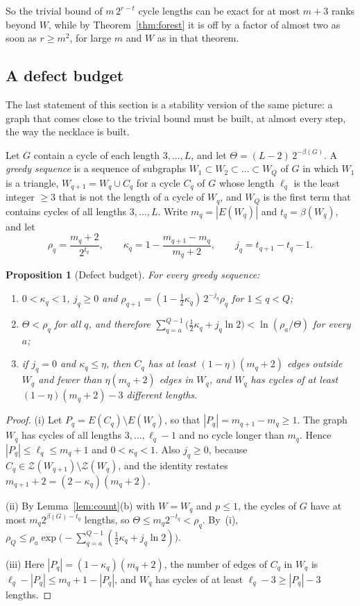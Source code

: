 \documentclass[11pt]{article}
\newtheorem{proposition}[theorem]{Proposition}
\theoremstyle{definition}
\theoremstyle{remark}
\newcommand{\Z}{\mathcal{Z}}
\newcommand{\sm}{\setminus}
\newcommand{\half}{\tfrac12}
\begin{document}
So the trivial bound of $m\,2^{r-t}$ cycle lengths can be exact for at most $m+3$ ranks beyond
$W$, while by Theorem~\ref{thm:forest} it is off by a factor of almost two as soon as $r\ge m^{2}$,
for large $m$ and $W$ as in that theorem.

\subsection{A defect budget}

The last statement of this section is a stability version of the same picture: a graph that comes
close to the trivial bound must be built, at almost every step, the way the necklace is built.

Let $G$ contain a cycle of each length $3,\dots,L$, and let $\Theta=(L-2)\,2^{-\beta(G)}$. A
\emph{greedy sequence} is a sequence of subgraphs $W_1\subset W_2\subset\dots\subset W_Q$ of $G$ in
which $W_1$ is a triangle, $W_{q+1}=W_q\cup C_q$ for a cycle $C_q$ of $G$ whose length $\ell_q$ is
the least integer $\ge3$ that is not the length of a cycle of $W_q$, and $W_Q$ is the first term
that contains cycles of all lengths $3,\dots,L$. Write $m_q=|E(W_q)|$ and $t_q=\beta(W_q)$, and let
\[
  \rho_q=\frac{m_q+2}{2^{t_q}},\qquad
  \kappa_q=1-\frac{m_{q+1}-m_q}{m_q+2},\qquad
  j_q=t_{q+1}-t_q-1 .
\]

\begin{proposition}[Defect budget]\label{prop:defect}
For every greedy sequence:
\begin{enumerate}
\item[\textup{(i)}] $0<\kappa_q<1$, $j_q\ge0$ and $\rho_{q+1}=(1-\half\kappa_q)\,2^{-j_q}\rho_q$ for
$1\le q<Q$;
\item[\textup{(ii)}] $\Theta<\rho_q$ for all $q$, and therefore
$\sum_{q=a}^{Q-1}\bigl(\half\kappa_q+j_q\ln2\bigr)<\ln(\rho_a/\Theta)$ for every $a$;
\item[\textup{(iii)}] if $j_q=0$ and $\kappa_q\le\eta$, then $C_q$ has at least $(1-\eta)(m_q+2)$
edges outside $W_q$ and fewer than $\eta(m_q+2)$ edges in $W_q$, and $W_q$ has cycles of at least
$(1-\eta)(m_q+2)-3$ different lengths.
\end{enumerate}
\end{proposition}

\begin{proof}
(i) Let $P_q=E(C_q)\sm E(W_q)$, so that $|P_q|=m_{q+1}-m_q\ge1$. The graph $W_q$ has cycles of all
lengths $3,\dots,\ell_q-1$ and no cycle longer than $m_q$. Hence $|P_q|\le\ell_q\le m_q+1$ and
$0<\kappa_q<1$. Also $j_q\ge0$, because $C_q\in\Z(W_{q+1})\sm\Z(W_q)$, and the identity restates
$m_{q+1}+2=(2-\kappa_q)(m_q+2)$.

(ii) By Lemma~\ref{lem:count}(b) with $W=W_q$ and $p\le1$, the cycles of $G$ have at most
$m_q2^{\beta(G)-t_q}$ lengths, so $\Theta\le m_q2^{-t_q}<\rho_q$. By~(i),
$\rho_Q\le\rho_a\exp\bigl(-\sum_{q=a}^{Q-1}(\half\kappa_q+j_q\ln2)\bigr)$.

(iii) Here $|P_q|=(1-\kappa_q)(m_q+2)$, the number of edges of $C_q$ in $W_q$ is
$\ell_q-|P_q|\le m_q+1-|P_q|$, and $W_q$ has cycles of at least $\ell_q-3\ge|P_q|-3$ lengths.
\end{proof}
\end{document}
